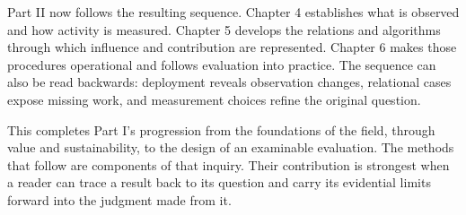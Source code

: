 Part II now follows the resulting sequence. Chapter 4 establishes what is observed and how activity is measured. Chapter 5 develops the relations and algorithms through which influence and contribution are represented. Chapter 6 makes those procedures operational and follows evaluation into practice. The sequence can also be read backwards: deployment reveals observation changes, relational cases expose missing work, and measurement choices refine the original question.

This completes Part I's progression from the foundations of the field, through value and sustainability, to the design of an examinable evaluation. The methods that follow are components of that inquiry. Their contribution is strongest when a reader can trace a result back to its question and carry its evidential limits forward into the judgment made from it.
